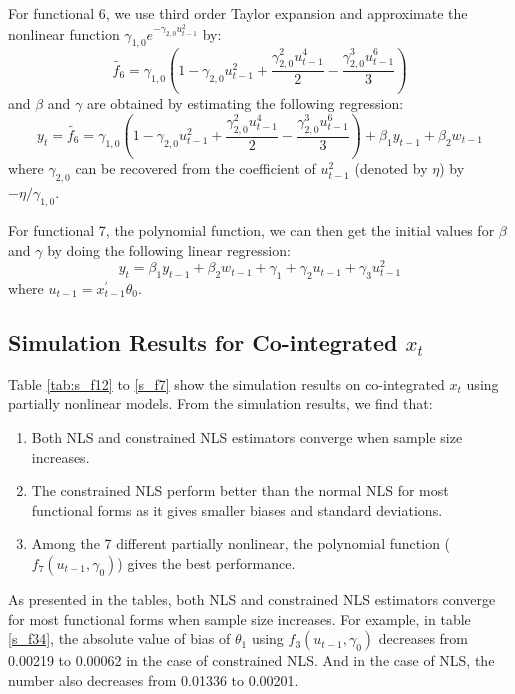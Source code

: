 \documentclass[a4paper,12pt,times,numbered,print,index]{report}
\numberwithin{equation}{section}
\begin{document}
	For functional 6, we use third order Taylor expansion and approximate the nonlinear function $\gamma_{1,0}e^{-\gamma_{2,0}u_{t-1}^2}$ by:
	$$
	\tilde{f_6}= \gamma_{1,0}(1-\gamma_{2,0}u_{t-1}^2 + \dfrac{\gamma_{2,0}^2 u_{t-1}^4}{2} - \dfrac{\gamma_{2,0}^3 u_{t-1}^6}{3})
	$$
	and $\beta$ and $\gamma$ are obtained by estimating the following regression:
	$$
	y_t = \tilde{f_6}= \gamma_{1,0}(1-\gamma_{2,0}u_{t-1}^2 + \dfrac{\gamma_{2,0}^2 u_{t-1}^4}{2} - \dfrac{\gamma_{2,0}^3 u_{t-1}^6}{3}) + \beta_{1}y_{t-1} + \beta_2w_{t-1}
	$$
	where $\gamma_{2,0}$ can be recovered from the coefficient of $u_{t-1}^2$ (denoted by $\eta$) by $-\eta/\gamma_{1,0}$.
	
	
	For functional 7, the polynomial function, we can then get the initial values for $\beta$ and $\gamma$ by doing the following linear regression:
	$$
	y_t = \beta_{1}y_{t-1} + \beta_2w_{t-1} + \gamma_{1}+ \gamma_{2}u_{t-1}+\gamma_{3}u_{t-1}^{2}
	$$
	where $u_{t-1} =  x_{t-1}^{\prime }\theta _{0}$.
	
	\subsection{Simulation Results for Co-integrated $x_t$}
	Table \ref{tab:s_f12} to \ref{s_f7} show the simulation results on co-integrated $x_t$ using partially nonlinear models. From the simulation results, we find that:
	
	\begin{enumerate}
		\item Both NLS and constrained NLS estimators converge when sample size increases.
		
		\item The constrained NLS perform better than the normal NLS for most functional forms as it gives smaller biases and standard deviations.
		
		\item Among the 7 different partially nonlinear, the polynomial function ($f_7(u_{t-1}, \gamma_0)$) gives the best performance.
		
	\end{enumerate}
	
	As presented in the tables, both NLS and constrained NLS estimators converge for most functional forms when sample size increases. For example, in table \ref{s_f34}, the absolute value of bias of $\theta_1$ using $f_3(u_{t-1}, \gamma_0)$ decreases from 0.00219 to 0.00062 in the case of constrained NLS. And in the case of NLS, the number also decreases from 0.01336 to 0.00201.
	
\end{document}
